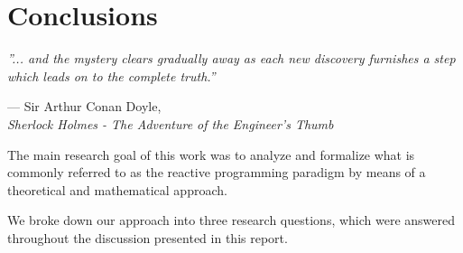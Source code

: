 \let\textcircled=\pgftextcircled
\chapter*{Conclusions}
\label{chap:discussion}

\epigraph{\hspace{4ex}\textit{''... and the mystery clears gradually away as each new discovery furnishes a step which leads on to the complete truth.''}}{--- Sir Arthur Conan Doyle,\\ \textit{Sherlock Holmes - The Adventure of the Engineer's Thumb}}

The main research goal of this work was to analyze and formalize what is commonly referred to as the reactive programming paradigm by means of a theoretical and mathematical approach. 

We broke down our approach into three research questions, which were answered throughout the discussion presented in this report.


